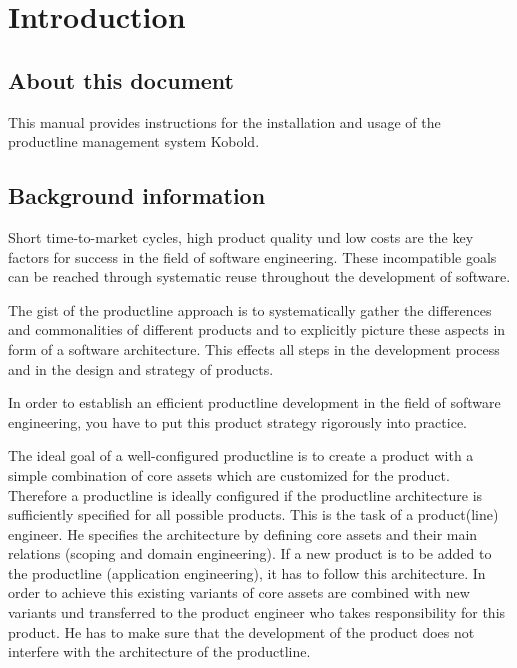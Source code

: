 \chapter{Introduction}

\section{About this document}

This manual provides instructions for the installation and usage of the
productline management system Kobold.

\section{Background information}

Short time-to-market cycles, high product quality und low costs are the 
key factors for success in the field of software engineering. These incompatible 
goals can be reached through systematic reuse throughout the development of
software. \par

The gist of the productline approach is to systematically gather the differences
and commonalities of different products and to explicitly picture these aspects
in form of a software architecture. This effects all steps in the development
process and in the design and strategy of products.\par

In order to establish an efficient productline development in the field of
software engineering, you have to put this product strategy rigorously into
practice.\par

The ideal goal of a well-configured productline is to create a product with a
simple combination of core assets which are customized for the product. Therefore 
a productline is ideally configured if the productline architecture is sufficiently
specified for all possible products. This is the task of a product(line) engineer.
He specifies the architecture by defining core assets and their main relations 
(scoping and domain engineering). If a new product is to be added to the productline 
(application engineering), it has to follow this architecture. In order to achieve
this existing variants of core assets are combined with new variants und transferred
to the product engineer who takes responsibility for this product. He has to make
sure that the development of the product does not interfere with the architecture
of the productline.\par

